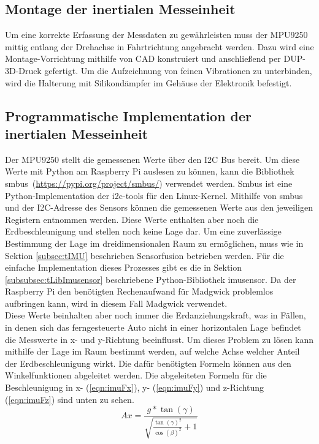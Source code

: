 \subsection{Montage der inertialen Messeinheit}
\label{subsec:IMUmount}
Um eine korrekte Erfassung der Messdaten zu gewährleisten muss der MPU9250 mittig entlang der Drehachse in Fahrtrichtung angebracht werden. Dazu wird eine Montage-Vorrichtung mithilfe von \ac{CAD} konstruiert und anschließend per \ac{DUP}-3D-Druck gefertigt. Um die Aufzeichnung von feinen Vibrationen zu unterbinden, wird die Halterung mit Silikondämpfer im Gehäuse der Elektronik befestigt. 

\subsection{Programmatische Implementation der inertialen Messeinheit}
\label{subsec:IMUprogram}
Der MPU9250 stellt die gemessenen Werte über den \ac{I2C} Bus bereit. Um diese Werte mit Python am Raspberry Pi auslesen zu können, kann die Bibliothek \glqq smbus\grqq \ (\url{https://pypi.org/project/smbus/}) verwendet werden. Smbus ist eine Python-Implementation der i2c-tools für den Linux-Kernel. Mithilfe von smbus und der \ac{I2C}-Adresse des Sensors können die gemessenen Werte aus den jeweiligen Registern entnommen werden. Diese Werte enthalten aber noch die Erdbeschleunigung und stellen noch keine Lage dar. Um eine zuverlässige Bestimmung der Lage im dreidimensionalen Raum zu ermöglichen, muss wie in Sektion \ref{subsec:tIMU} beschrieben Sensorfusion betrieben werden. Für die einfache Implementation dieses Prozesses gibt es die in Sektion \ref{subsubsec:tLibImusensor} beschriebene Python-Bibliothek \glqq imusensor\grqq . Da der Raspberry Pi den benötigten Rechenaufwand für Madgwick problemlos aufbringen kann, wird in diesem Fall Madgwick verwendet. \\
Diese Werte beinhalten aber noch immer die Erdanziehungskraft, was in Fällen, in denen sich das ferngesteuerte Auto nicht in einer horizontalen Lage befindet die Messwerte in x- und y-Richtung beeinflusst. Um dieses Problem zu lösen kann mithilfe der Lage im Raum bestimmt werden, auf welche Achse welcher Anteil der Erdbeschleunigung  wirkt. Die dafür benötigten Formeln können aus den Winkelfunktionen abgeleitet werden.
Die abgeleiteten Formeln für die Beschleunigung in x- (\ref{eqn:imuFx}), y- (\ref{eqn:imuFy}) und z-Richtung (\ref{eqn:imuFz}) sind unten zu sehen.
\begin{equation}
Ax=\frac{g*\tan(\gamma)}{\sqrt{\frac{\tan(\gamma)^2}{\cos(\beta)^2}+1}}
\label{eqn:imuFx}
\end{equation}

